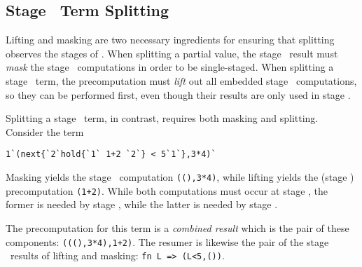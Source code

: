 


\subsection{Stage \bbone\ Term Splitting}

Lifting and masking are two necessary ingredients for ensuring that splitting
observes the stages of \lang. When splitting a partial value, the stage \bbone\
result must \emph{mask} the stage \bbtwo\ computations in order to be
single-staged. When splitting a stage \bbtwo\ term, the precomputation must
\emph{lift} out all embedded stage \bbone\ computations, so they can be
performed first, even though their results are only used in stage \bbtwo.

Splitting a stage \bbone\ term, in contrast, requires both masking and splitting.
Consider the term 
\begin{lstlisting}
1`(next{`2`hold{`1` 1+2 `2`} < 5`1`},3*4)`
\end{lstlisting}
Masking yields the stage \bbone\ computation \verb|((),3*4)|, while lifting
yields the (stage \bbone) precomputation \verb|(1+2)|. While both computations
must occur at stage \bbone, the former is needed by stage \bbone, while the
latter is needed by stage \bbtwo.

The precomputation for this term is a \emph{combined result} which is
the pair of these components: \verb|(((),3*4),1+2)|. The resumer is
likewise the pair of the stage \bbtwo\ results of lifting and masking:
\verb|fn L => (L<5,())|.

